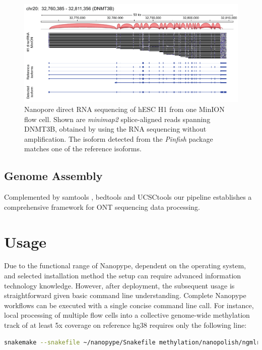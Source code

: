 \begin{figure}[h]
	\centering
	\includegraphics[width=1.0\textwidth]{figures/nanopype/rna_isoforms.pdf}
	\captionsetup{format=plain}
	\caption[Nanopore direct RNA sequencing]{Nanopore direct RNA sequencing of hESC H1 from one MinION flow cell. Shown are \textit{minimap2} splice-aligned reads spanning DNMT3B, obtained by using the RNA sequencing without amplification. The isoform detected from the \textit{Pinfish} package matches one of the reference isoforms.}
	\label{fig:nanopype:rna_isoforms}
\end{figure}

\subsection{Genome Assembly}
\label{subsec:nanopype:assembly}



Complemented by samtools \cite{Li2009}, bedtools \cite{Quinlan2010} and UCSCtools \cite{Kent2010} our pipeline establishes a comprehensive framework for ONT sequencing data processing.




\section{Usage}
\label{sec:nanopype:usage}
Due to the functional range of Nanopype, dependent on the operating system, and selected installation method the setup can require advanced information technology knowledge. However, after deployment, the subsequent usage is straightforward given basic command line understanding. Complete Nanopype workflows can be executed with a single concise command line call. For instance, local processing of multiple flow cells into a collective genome-wide methylation track of at least 5x coverage on reference hg38 requires only the following line:

\begin{lstlisting}[language=sh, caption=Snakemake example]
snakemake --snakefile ~/nanopype/Snakefile methylation/nanopolish/ngmlr/guppy/Hues8.5x.hg38.bw
\end{lstlisting}

